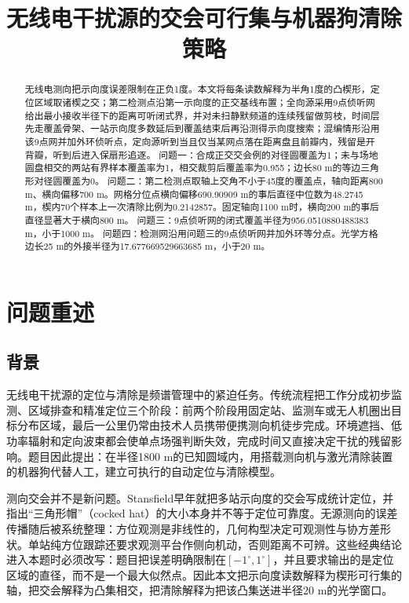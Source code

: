\documentclass{cumcmthesis}
\title{无线电干扰源的交会可行集与机器狗清除策略}
\begin{document}
\maketitle

\begin{abstract}
无线电测向把示向度误差限制在正负1度。本文将每条读数解释为半角1度的凸楔形，定位区域取诸楔之交；第二检测点沿第一示向度的正交基线布置；全向源采用9点侦听网给出最小接收半径下的距离可听闭式界，并对未扫静默频道的连续残留做剪枝，时间层先走覆盖骨架、一站示向度多数延后到覆盖结束后再沿测得示向度搜索；混编情形沿用该9点网并加外环侦听点，定向源听到当且仅当某网点落在距离盘且前瓣内，残留是开背瓣，听到后进入保扇形追逐。
问题一：合成正交交会例的对径圆覆盖为1；未与场地圆盘相交的两站有界样本覆盖率为1，相交裁剪后覆盖率为0.955；边长80 m的等边三角形对径圆覆盖为0。
问题二：第二检测点取轴上交角不小于45度的覆盖点，轴向距离800 m、横向偏移700 m。网格分位点横向偏移690.90909 m的事后直径中位数为48.2745 m，楔内70个样本上一次清除比例为0.2142857。固定轴向1100 m时，横向200 m的事后直径显著大于横向800 m。
问题三：9点侦听网的闭式覆盖半径为956.0510880488383 m，小于1000 m。
问题四：检测网沿用问题三的9点侦听网并加外环等分点。光学方格边长25 m的外接半径为17.677669529663685 m，小于20 m。
\end{abstract}

\section{问题重述}

\subsection{背景}

无线电干扰源的定位与清除是频谱管理中的紧迫任务。传统流程把工作分成初步监测、区域排查和精准定位三个阶段：前两个阶段用固定站、监测车或无人机圈出目标分布区域，最后一公里仍常由技术人员携带便携测向机徒步完成。环境遮挡、低功率辐射和定向波束都会使单点场强判断失效，完成时间又直接决定干扰的残留影响。题目因此提出：在半径1800 m的已知圆域内，用搭载测向机与激光清除装置的机器狗代替人工，建立可执行的自动定位与清除模型。

测向交会并不是新问题。Stansfield早年就把多站示向度的交会写成统计定位，并指出“三角形帽”（cocked hat）的大小本身并不等于定位可靠度\cite{stansfield1947}。无源测向的误差传播随后被系统整理：方位观测是非线性的，几何构型决定可观测性与协方差形状\cite{torrieri1984,foy1976}。单站纯方位跟踪还要求观测平台作侧向机动，否则距离不可辨\cite{nardone1984}。这些经典结论进入本题时必须改写：题目把误差明确限制在$[-1^\circ,1^\circ]$，并且要求输出的是定位区域的直径，而不是一个最大似然点。因此本文把示向度读数解释为楔形可行集的轴，把交会解释为凸集相交，把清除解释为把该凸集送进半径20 m的光学窗口。
\end{document}
